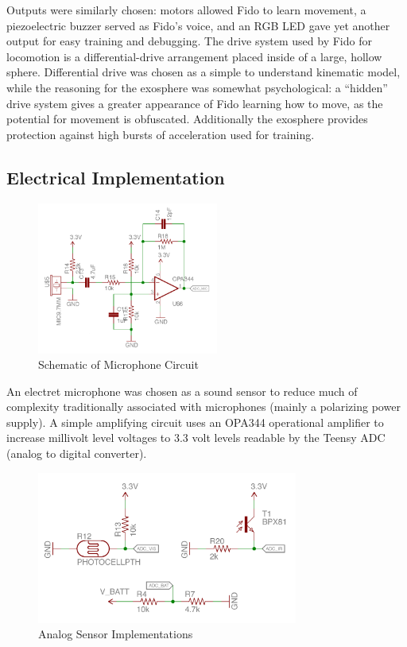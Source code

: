 Outputs were similarly chosen: motors allowed Fido to learn movement, a piezoelectric buzzer served as Fido's voice, and an RGB LED gave yet another output for easy training and debugging.  The drive system used by Fido for locomotion is a differential-drive arrangement placed inside of a large, hollow sphere.  Differential drive was chosen as a simple to understand kinematic model, while the reasoning for the exosphere was somewhat psychological: a ``hidden'' drive system gives a greater appearance of Fido learning how to move, as the potential for movement is obfuscated.  Additionally the exosphere provides protection against high bursts of acceleration used for training.

\subsection{Electrical Implementation}

\begin{figure}[ht]
	\centering
	\includegraphics[height=5cm]{Figures/micDiagram.png}
	\caption{Schematic of Microphone Circuit}
\end{figure}

An electret microphone was chosen as a sound sensor to reduce much of complexity traditionally associated with microphones (mainly a polarizing power supply).  A simple amplifying circuit uses an OPA344 operational amplifier to increase millivolt level voltages to 3.3 volt levels readable by the Teensy ADC (analog to digital converter).

\begin{figure}[ht]
	\centering
	\includegraphics[height=5cm]{Figures/divDiagram.png}
	\caption{Analog Sensor Implementations}
\end{figure}

